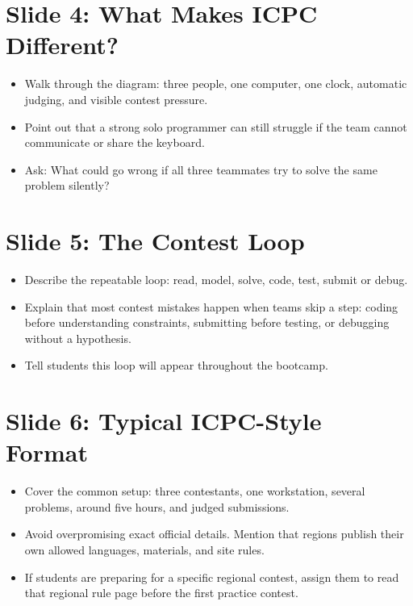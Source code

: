 \documentclass[11pt]{article}
\begin{document}
\section*{Slide 4: What Makes ICPC Different?}
\begin{itemize}
  \item Walk through the diagram: three people, one computer, one clock, automatic judging, and visible contest pressure.
  \item Point out that a strong solo programmer can still struggle if the team cannot communicate or share the keyboard.
  \item Ask: What could go wrong if all three teammates try to solve the same problem silently?
\end{itemize}

\section*{Slide 5: The Contest Loop}
\begin{itemize}
  \item Describe the repeatable loop: read, model, solve, code, test, submit or debug.
  \item Explain that most contest mistakes happen when teams skip a step: coding before understanding constraints, submitting before testing, or debugging without a hypothesis.
  \item Tell students this loop will appear throughout the bootcamp.
\end{itemize}

\section*{Slide 6: Typical ICPC-Style Format}
\begin{itemize}
  \item Cover the common setup: three contestants, one workstation, several problems, around five hours, and judged submissions.
  \item Avoid overpromising exact official details. Mention that regions publish their own allowed languages, materials, and site rules.
  \item If students are preparing for a specific regional contest, assign them to read that regional rule page before the first practice contest.
\end{itemize}
\end{document}

